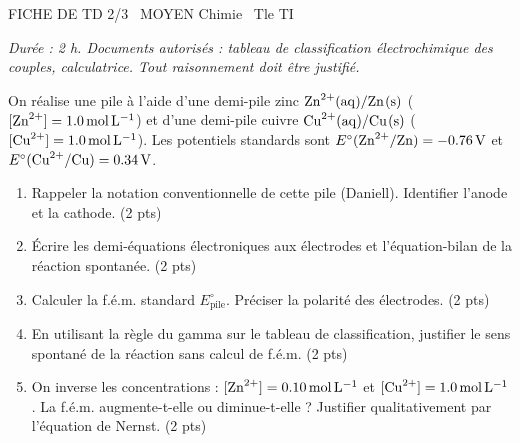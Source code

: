 \documentclass[11pt]{article}
\begin{document}
\begin{tcolorbox}[enhanced,colback=popink,colframe=popink,arc=10pt,boxrule=0pt,left=12pt,right=12pt,top=9pt,bottom=9pt]
{\color{white}\popxbold\small FICHE DE TD 2/3 \textbullet\ MOYEN \hfill Chimie \textbullet\ Tle TI\par}
\end{tcolorbox}
\vspace{4pt}
\emph{Durée : 2 h. Documents autorisés : tableau de classification électrochimique des couples, calculatrice. Tout raisonnement doit être justifié.}

\begin{exercice}
On réalise une pile à l'aide d'une demi-pile zinc $\ce{Zn^{2+}(aq)/Zn(s)}$ ($[\ce{Zn^{2+}}] = \SI{1,0}{mol.L^{-1}}$) et d'une demi-pile cuivre $\ce{Cu^{2+}(aq)/Cu(s)}$ ($[\ce{Cu^{2+}}] = \SI{1,0}{mol.L^{-1}}$). Les potentiels standards sont $E^\circ(\ce{Zn^{2+}/Zn}) = \SI{-0,76}{V}$ et $E^\circ(\ce{Cu^{2+}/Cu}) = \SI{+0,34}{V}$.
\begin{enumerate}
    \item Rappeler la notation conventionnelle de cette pile (Daniell). Identifier l'anode et la cathode. (2 pts)
    \item Écrire les demi-équations électroniques aux électrodes et l'équation-bilan de la réaction spontanée. (2 pts)
    \item Calculer la f.é.m. standard $E^\circ_{\text{pile}}$. Préciser la polarité des électrodes. (2 pts)
    \item En utilisant la règle du gamma sur le tableau de classification, justifier le sens spontané de la réaction sans calcul de f.é.m. (2 pts)
    \item On inverse les concentrations : $[\ce{Zn^{2+}}] = \SI{0,10}{mol.L^{-1}}$ et $[\ce{Cu^{2+}}] = \SI{1,0}{mol.L^{-1}}$. La f.é.m. augmente-t-elle ou diminue-t-elle ? Justifier qualitativement par l'équation de Nernst. (2 pts)
\end{enumerate}
\end{exercice}
\end{document}
